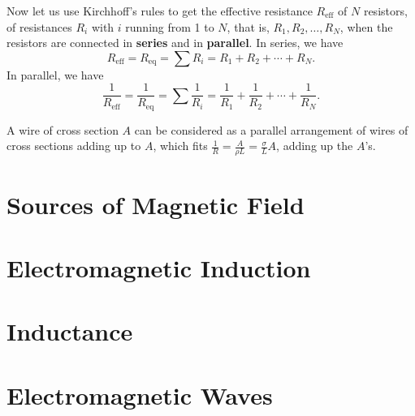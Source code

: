 \documentclass[11pt, letterpaper, titlepage]{report}
\begin{document}
Now let us use Kirchhoff's rules to get the effective resistance $R_\text{eff}$ of $N$ resistors, of resistances $R_i$ with $i$ running from 1 to $N$, that is, $R_1, R_2, \ldots, R_N$, when the resistors are connected in \textbf{series} and in \textbf{parallel}. In series, we have 
\begin{equation}
R_\text{eff} = R_\text{eq} = \sum R_i = R_1 + R_2 + \cdots + R_N.
\end{equation}
In parallel, we have
\begin{equation}
\dfrac{1}{R_\text{eff}} = \dfrac{1}{R_\text{eq}} = \sum \dfrac{1}{R_i} = \dfrac{1}{R_1} + \dfrac{1}{R_2} + \cdots + \dfrac{1}{R_N}.
\end{equation}

A wire of cross section $A$ can be considered as a parallel arrangement of wires of cross sections adding up to $A$, which fits $\frac{1}{R} = \frac{A}{\rho L} = \frac{\sigma}{L}A$, adding up the $A$'s.



\chapter{Sources of Magnetic Field}
\chapter{Electromagnetic Induction}
\chapter{Inductance}
\chapter{Electromagnetic Waves}
\end{document}
